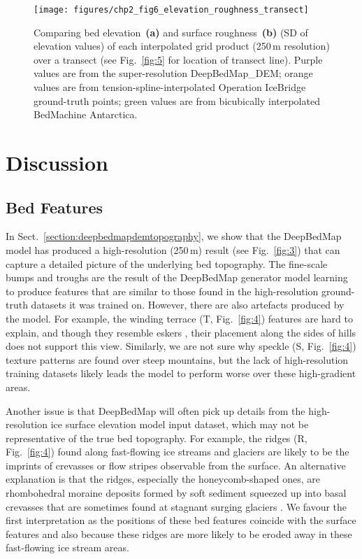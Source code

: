 \begin{figure}[htbp]
  \texttt{[image: figures/chp2\_fig6\_elevation\_roughness\_transect]}
  \caption[Transect plots of bed elevation and surface roughness of interpolated grid products]{
    Comparing bed elevation~\textbf{(a)} and surface roughness~\textbf{(b)} (SD of elevation values) of each interpolated grid product (250\,\unit{m} resolution) over a transect (see Fig.~\ref{fig:5} for location of transect line).
    Purple values are from the super-resolution DeepBedMap\_DEM;
    orange values are from tension-spline-interpolated Operation IceBridge ground-truth points;
    green values are from bicubically interpolated BedMachine Antarctica.
  }
  \label{fig:6}
\end{figure}


\clearpage
\section{Discussion}

\subsection{Bed Features}

In Sect.~\ref{section:deepbedmapdemtopography}, we show that the DeepBedMap model has produced a high-resolution (250\,\unit{m}) result (see Fig.~\ref{fig:3}) that can capture a detailed picture of the underlying bed topography.
The fine-scale bumps and troughs are the result of the DeepBedMap generator model learning to produce features that are similar to those found in the high-resolution ground-truth datasets it was trained on.
However, there are also artefacts produced by the model.
For example, the winding terrace (T, Fig.~\ref{fig:4}) features are hard to explain, and though they resemble eskers \citep{DrewsActivelyevolvingsubglacial2017}, their placement along the sides of hills does not support this view.
Similarly, we are not sure why speckle (S, Fig.~\ref{fig:4}) texture patterns are found over steep mountains, but the lack of high-resolution training datasets likely leads the model to perform worse over these high-gradient areas.

Another issue is that DeepBedMap will often pick up details from the high-resolution ice surface elevation model \citep{HowatReferenceElevationModel2019} input dataset, which may not be representative of the true bed topography.
For example, the ridges (R, Fig.~\ref{fig:4}) found along fast-flowing ice streams and glaciers are likely to be the imprints of crevasses or flow stripes \citep{GlasserLongitudinalsurfacestructures2012} observable from the surface.
An alternative explanation is that the ridges, especially the honeycomb-shaped ones, are rhombohedral moraine deposits formed by soft sediment squeezed up into basal crevasses that are sometimes found at stagnant surging glaciers \citep{Dowdeswellvarietydistributionsubmarine2016,DowdeswellRhombohedralcrevassefillridges2016,SolheimSeafloormorphologyoutside1985}.
We favour the first interpretation as the positions of these bed features coincide with the surface features and also because these ridges are more likely to be eroded away in these fast-flowing ice stream areas.

